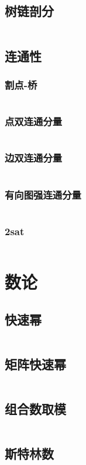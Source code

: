 \documentclass[a4paper,6pt]{article}
\begin{document}
\subsection{树链剖分}
\inputminted[breaklines]{c++}{graph-theory/HLD.cpp}
\subsection{连通性}
\subsubsection{割点-桥}
\inputminted[breaklines]{c++}{graph-theory/connect/cut-bridge.cpp}
\subsubsection{点双连通分量}
\inputminted[breaklines]{c++}{graph-theory/connect/point-DCC.cpp}
\subsubsection{边双连通分量}
\inputminted[breaklines]{c++}{graph-theory/connect/edge-DCC.cpp}
\subsubsection{有向图强连通分量}
\inputminted[breaklines]{c++}{graph-theory/connect/DG-tarjan.cpp}
\subsubsection{2sat}
\inputminted[breaklines]{c++}{graph-theory/connect/2sat.cpp}

\newpage
\section{数论}
\subsection{快速幂}
\inputminted[breaklines]{c++}{math/quickpow.cpp}
\subsection{矩阵快速幂}
\inputminted[breaklines]{c++}{math/matrix-quickpow.cpp}
\subsection{组合数取模}
\inputminted[breaklines]{c++}{math/Cmod.cpp}
\subsection{斯特林数}
\inputminted[breaklines]{c++}{math/Stirling.cpp}
\end{document}

